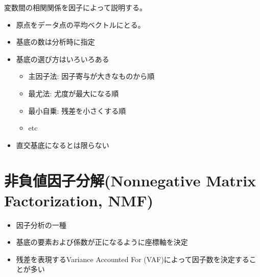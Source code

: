 \documentclass[a4paper,11pt]{jsarticle}
\begin{document}
変数間の相関関係を因子によって説明する。

\begin{itemize}
  \item 原点をデータ点の平均ベクトルにとる。
  \item 基底の数は分析時に指定
  \item 基底の選び方はいろいろある
  \begin{itemize}
    \item 主因子法: 因子寄与が大きなものから順
    \item 最尤法: 尤度が最大になる順
    \item 最小自乗: 残差を小さくする順
    \item etc
  \end{itemize}
    \item 直交基底になるとは限らない
    \end{itemize}
  
\section{非負値因子分解(Nonnegative Matrix Factorization, NMF)}

\begin{itemize}
  \item 因子分析の一種
  \item 基底の要素および係数が正になるように座標軸を決定
  \item 残差を表現するVariance Accounted For (VAF)によって因子数を決定することが多い
\end{itemize}
\end{document}
